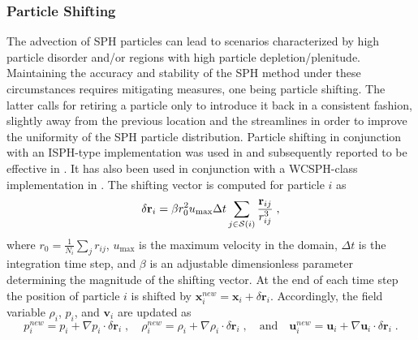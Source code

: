 \subsubsection{Particle Shifting}\label{subsec:Par_Shift}  %
The advection of SPH particles can lead to scenarios characterized by high particle disorder and/or regions with high particle depletion/plenitude. Maintaining the accuracy and stability of the SPH method under these circumstances requires mitigating measures, one being particle shifting. The latter calls for retiring a particle only to introduce it back in a consistent fashion, slightly away from the previous location and the streamlines in order to improve the uniformity of the SPH particle distribution. Particle shifting in conjunction with an ISPH-type implementation was used in \cite{Xu2009Accuracy} and subsequently reported to be effective in \cite{Trask2015}. It has also been used in conjunction with a WCSPH-class implementation in \cite{Shadloo2012Robust}. The shifting vector is computed for particle $i$ as
\begin{equation*}
\delta \textbf{r}_{i} = \beta r_0^2 u_\mathrm{max} \Delta t\sum\limits_{j \in {{\mathcal{S}({i})}}}  \frac{\textbf{r}_{ij}}{r_{ij}^3} \; ,
\end{equation*}
where $r_0=\frac{1}{N_i}\sum\limits_j  {r_{ij}}$, $u_\mathrm{max}$ is the maximum velocity in the domain, $\Delta t$ is the integration time step, and $\beta$ is an adjustable dimensionless parameter determining the magnitude of the shifting vector. At the end of each time step the position of particle $i$ is shifted by $\textbf{x}_{i}^{new} = \textbf{x}_{i} + \delta \textbf{r}_{i}$. Accordingly, the field variable $\rho_{i}$, $p_{i}$, and $\textbf{v}_{i}$ are updated as 
\begin{equation*}
p_{i}^{new} = p_{i} + \nabla p_{i}\cdot \delta \textbf{r}_{i} \; , \quad
\rho_{i}^{new} = \rho_{i} + \nabla \rho_{i}\cdot \delta \textbf{r}_{i} \;, \quad \mbox{and} \quad
\mathbf{u}_{i}^{new} = \mathbf{u}_{i} + \nabla \mathbf{u}_{i}\cdot \delta \textbf{r}_{i} \; .
\end{equation*}

